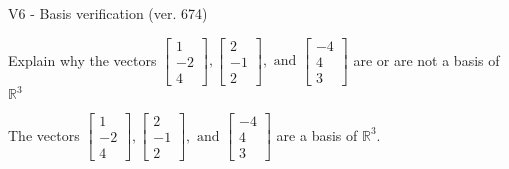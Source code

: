 \begin{exercise}
  \begin{exerciseTitle}V6 - Basis verification (ver. 674)\end{exerciseTitle}
  \begin{exerciseStatement}
    Explain why the vectors \(\left[\begin{array}{r}
1 \\
-2 \\
4
\end{array}\right] , \left[\begin{array}{r}
2 \\
-1 \\
2
\end{array}\right] , \text{ and } \left[\begin{array}{r}
-4 \\
4 \\
3
\end{array}\right]\) are or are not a basis of \(\mathbb{R}^3\)	


  \end{exerciseStatement}
  \begin{exerciseAnswer}
   The vectors \(\left[\begin{array}{r}
1 \\
-2 \\
4
\end{array}\right] , \left[\begin{array}{r}
2 \\
-1 \\
2
\end{array}\right] , \text{ and } \left[\begin{array}{r}
-4 \\
4 \\
3
\end{array}\right]\) 
  	 are  a basis of \(\mathbb{R}^3\).
  


  \end{exerciseAnswer}
\end{exercise}